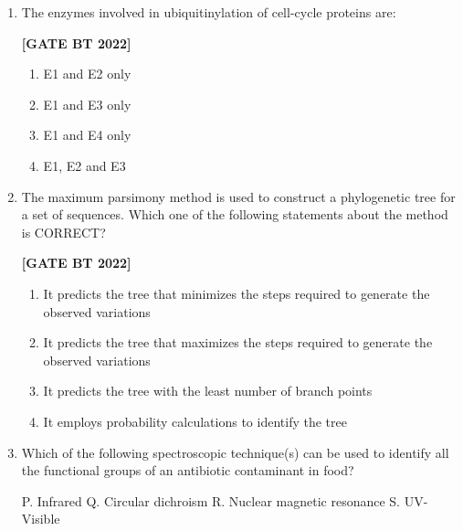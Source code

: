 \documentclass[12pt]{article}
\begin{document}
\begin{enumerate}[leftmargin=2.5em, label=\textbf{Q.\arabic*}., itemsep=2em, resume]
\noindent \textbf{[GATE BT 2022]}
\begin{multicols}{2}
\begin{enumerate}
    \item P and Q only
    \item P and R only
    \item Q and R only
    \item P, Q and R
\end{enumerate}
\end{multicols}

\item The enzymes involved in ubiquitinylation of cell-cycle proteins are:

\noindent \textbf{[GATE BT 2022]}
\begin{multicols}{2}
\begin{enumerate}
    \item E1 and E2 only
    \item E1 and E3 only
    \item E1 and E4 only
    \item E1, E2 and E3
\end{enumerate}
\end{multicols}

\item The maximum parsimony method is used to construct a phylogenetic tree for a set of sequences.  
Which one of the following statements about the method is CORRECT?

\noindent \textbf{[GATE BT 2022]}
\begin{multicols}{2}
\begin{enumerate}
    \item It predicts the tree that minimizes the steps required to generate the observed variations
    \item It predicts the tree that maximizes the steps required to generate the observed variations
    \item It predicts the tree with the least number of branch points
    \item It employs probability calculations to identify the tree
\end{enumerate}
\end{multicols}

\item Which of the following spectroscopic technique(s) can be used to identify all the functional groups of an antibiotic contaminant in food?  

P. Infrared  
Q. Circular dichroism  
R. Nuclear magnetic resonance  
S. UV-Visible  


\end{enumerate}
\end{document}
